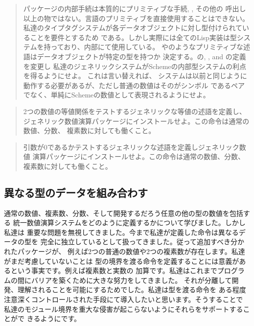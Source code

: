 \begin{quote}
パッケージの内部手続は本質的にプリミティブな手続\code{+}, \code{-}, その他の
呼出し以上の物ではない。言語のプリミティブを直接使用することはできない。
私達のタイプタグシステムが各データオブジェクトに対し型付けられていることを要件とするため
である。しかし実際には全てのLisp実装は型システムを持っており、内部にて使用している。
やのようなプリミティブな述語はデータオブジェクトが特定の型を持つか
決定する。の, , and の定義を変更し
私達のジェネリックシステムがSchemeの内部型システムの利点を得るようにせよ。
これは言い替えれば、
システムは以前と同じように動作する必要があるが、ただし普通の数値はそのがシンボル
であるペアでなく、単純にSchemeの数値として表現されるようにせよ。
\end{quote}

\begin{quote}
2つの数値の等値関係をテストするジェネリックな等値の述語を定義し、
ジェネリック数値演算パッケージにインストールせよ。この命令は通常の数値、分数、
複素数に対しても働くこと。
\end{quote}

\begin{quote}
引数が0であるかテストするジェネリックな述語を定義しジェネリック数値
演算パッケージにインストールせよ。この命令は通常の数値、分数、
複素数に対しても働くこと。
\end{quote}

\subsection{異なる型のデータを組み合わす}
\label{Section 2.5.2}



通常の数値、複素数、分数、そして開発するだろう任意の他の型の数値を包括する
統一数値演算システムをどのように定義するかについて学びました。しかし私達は
重要な問題を無視してきました。今まで私達が定義した命令は異なるデータの型を
完全に独立しているとして扱ってきました。従って追加すべき分かれたパッケージが、
例えば2つの普通の数値や2つの複素数が存在します。私達がまだ考慮していないことは
型の境界を渡る命令を定義することには意義があるという事実です。例えば複素数と実数の
加算です。私達はこれまでプログラムの間にバリアを築くために大きな努力をしてきました。
それが分離して開発、理解されることを可能にするためでした。私達は型を渡る命令を
ある程度注意深くコントロールされた手段にて導入したいと思います。そうすることで
私達のモジュール境界を重大な侵害が起こらないようにそれらをサポートすることがで
きるようにです。


